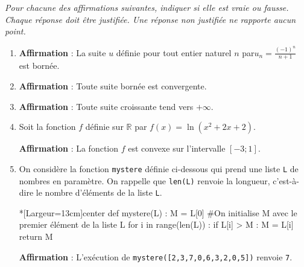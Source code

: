 \textit{Pour chacune des affirmations suivantes, indiquer si elle est vraie ou fausse. Chaque réponse doit être justifiée. Une réponse non justifiée ne rapporte aucun point.}

\medskip

\begin{enumerate}
	\item \textbf{Affirmation} : La suite $u$ définie pour tout entier naturel $n$ par$u_n = \frac{(-1)^n}{n+1}$ est bornée.
	\item \textbf{Affirmation} : Toute suite bornée est convergente.
	\item \textbf{Affirmation} : Toute suite croissante tend vers $+\infty$.
	\item Soit la fonction $f$ définie sur $\mathbb{R}$ par $f(x)=\ln(x^2+2x+2)$.
	
	\smallskip
	
	\textbf{Affirmation} : La fonction $f$ est convexe sur l’intervalle $[-3;1]$.
	\item On considère la fonction \texttt{mystere} définie ci-dessous qui prend une liste \texttt{L} de nombres en paramètre. On rappelle que \texttt{len(L)} renvoie la longueur, c’est-à-dire le nombre d’éléments de la liste \texttt{L}.
	
\begin{CodePythonLst}*[Largeur=13cm]{center}
def mystere(L) :
	M = L[0]
	#On initialise M avec le premier élément de la liste L
	for i in range(len(L)) :
		if L[i] > M :
			M = L[i]
	return M
\end{CodePythonLst}

	\textbf{Affirmation} : L’exécution de \texttt{mystere([2,3,7,0,6,3,2,0,5])} renvoie \texttt{7}.
\end{enumerate}